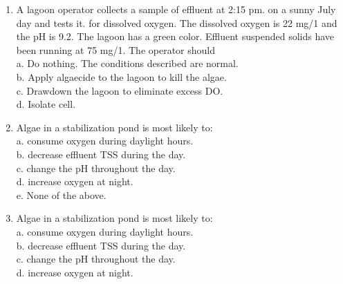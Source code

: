 \begin{tcolorbox}[breakable, enhanced,
colframe=blue!25,
colback=blue!10,
coltitle=blue!20!black,  
title= Chapter Assessment]
\begin{enumerate}
c. during nighttime when the production of CO2 is highest \\

d. during nighttime when the production of CO2 is lowest \\


\item  A lagoon operator collects a sample of effluent at 2:15 pm. on a sunny July day and tests it. for dissolved oxygen. The dissolved oxygen is 22 mg/1 and the pH is 9.2.  The lagoon has a green color. Effluent suspended solids have been running at 75 mg/1.  The operator should \\


a. Do nothing. The conditions described are normal. \\

b. Apply algaecide to the lagoon to kill the algae. \\

c. Drawdown the lagoon to eliminate excess DO. \\

d. Isolate cell. \\


\item  Algae in a stabilization pond is most likely to: \\


a. consume oxygen during daylight hours. \\

b. decrease effluent TSS during the day. \\

c. change the pH throughout the day. \\

d. increase oxygen at night. \\

e. None of the above. \\


\item  Algae in a stabilization pond is most likely to: \\


a. consume oxygen during daylight hours. \\

b. decrease effluent TSS during the day. \\

c. change the pH throughout the day. \\

d. increase oxygen at night. \\


\end{enumerate}
\end{tcolorbox}
